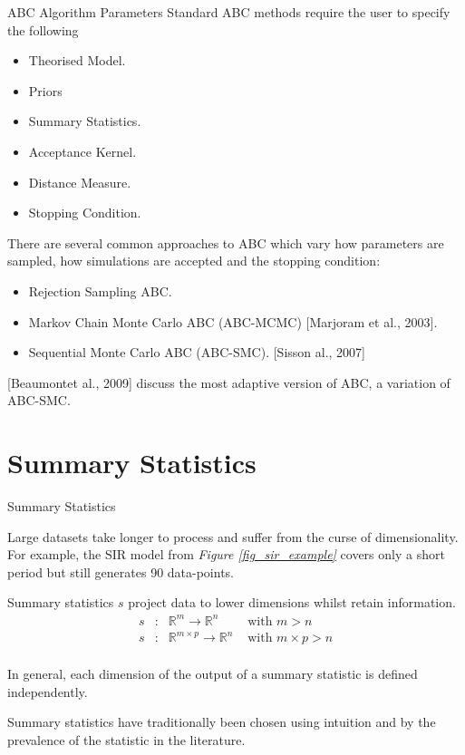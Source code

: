 \documentclass[aspectratio=169]{beamer}
\begin{document}
\begin{frame}{ABC Algorithm Parameters}
  \setlength{\parskip}{.1\baselineskip}
  Standard ABC methods require the user to specify the following
  \begin{multicols}{2}
    \begin{itemize}
      \item Theorised Model.
      \item Priors
      \item Summary Statistics.
      \item Acceptance Kernel.
      \item Distance Measure.
      \item Stopping Condition.
    \end{itemize}
  \end{multicols}
  \par There are several common approaches to ABC which vary how parameters are sampled, how simulations are accepted and the stopping condition:
  \begin{itemize}
    \item Rejection Sampling ABC.
    \item Markov Chain Monte Carlo ABC (ABC-MCMC) [Marjoram et al., 2003].
    \item Sequential Monte Carlo ABC (ABC-SMC). [Sisson al., 2007]
  \end{itemize}
  [Beaumontet al., 2009] discuss the most adaptive version of ABC, a variation of ABC-SMC.
\end{frame}

\section{Summary Statistics}

\begin{frame}{Summary Statistics}
  \par Large datasets take longer to process and suffer from the curse of dimensionality. For example, the SIR model from \textit{Figure \ref{fig_sir_example}} covers only a short period but still generates 90 data-points.
  \par Summary statistics $s$ project data to lower dimensions whilst retain information.
  \[\begin{array}{rcll}
    s&:&\mathbb{R}^m\to\mathbb{R}^n&\text{ with }m>n\\
    s&:&\mathbb{R}^{m\times p}\to\mathbb{R}^n&\text{ with }m\times p>n\\
  \end{array}\]
  \par In general, each dimension of the output of a summary statistic is defined independently.
  \par Summary statistics have traditionally been chosen using intuition and by the prevalence of the statistic in the literature.
\end{frame}
\end{document}
